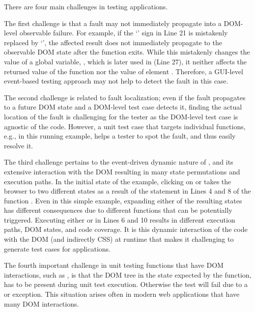 There are four main challenges in testing \javascript applications. 
 
The first challenge is that a fault may not immediately propagate into a DOM-level observable failure. %
For example, if the `\code{+}' sign in Line 21 is mistakenly replaced by `\code{-}', the affected result does not immediately propagate to the observable DOM state after the function exits. While this mistakenly changes the value of a global variable, , which is 
later used in   (Line 27), it neither affects the returned value of the  function nor the  value of element . Therefore, a GUI-level event-based testing approach may not help to detect the fault in this case.

The second challenge is related to fault localization; even if the fault propagates to a future DOM state and a DOM-level test case detects it, finding the actual location of the fault is challenging for the tester as the DOM-level test case is agnostic of the \javascript code.
However, a unit test case that targets individual functions, e.g.,  in this running example, helps a tester to spot the fault, and thus easily resolve it. %

The third challenge pertains to the event-driven dynamic nature of \javascript, and its extensive interaction with the DOM  resulting in many state permutations and execution paths. In the initial state of the example, clicking on  or  takes the browser to two different states as a result of the  statement in Lines 4 and 8 of the function . 
Even in this simple example, expanding either of the resulting states has different consequences due to different functions that can be potentially triggered. 
Executing either  or  in Lines 6 and 10 results in different execution paths, DOM states, and code coverage. 
It is this dynamic interaction of the \javascript code with the DOM (and indirectly CSS) at runtime that makes it challenging to generate test cases for \javascript applications.  

The fourth important challenge in unit testing \javascript functions that have DOM interactions, such as , is that the DOM tree in the state expected by the function, has to be present during unit test execution. Otherwise the test will fail due to a  or  exception. This situation arises often in modern web applications that have many DOM interactions.
